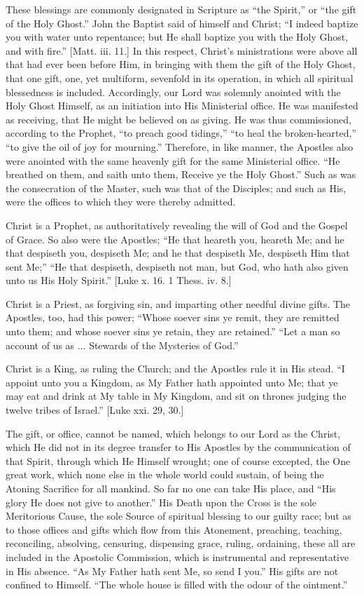 These blessings are commonly designated in Scripture as ``the
Spirit,'' or ``the gift of the Holy Ghost.'' John the
Baptist said of himself and Christ; ``I indeed baptize you with
water unto repentance; but He shall baptize you with the Holy Ghost, and
with fire.'' [Matt. iii. 11.] In this respect, Christ's
ministrations were above all that had ever been before Him, in bringing
with them the gift of the Holy Ghost, that one gift, one, yet multiform,
sevenfold in its operation, in which all spiritual blessedness is
included. Accordingly, our Lord was solemnly anointed with the Holy
Ghost Himself, as an initiation into His Ministerial office. He was
manifested as receiving, that He might be believed on as giving. He was
thus commissioned, according to the Prophet, ``to preach good
tidings,'' ``to heal the broken-hearted,'' ``to give the
oil of joy for mourning.'' Therefore, in like manner, the Apostles
also were anointed with the same heavenly gift for the same Ministerial
office. ``He breathed on them, and saith unto them, Receive ye the
Holy Ghost.'' Such as was the consecration of the Master, such was
that of the Disciples; and such as His, were the offices to which they
were thereby admitted.

Christ is a Prophet, as authoritatively revealing the will of God and
the Gospel of Grace. So also were the Apostles; ``He that heareth
you, heareth Me; and he that despiseth you, despiseth Me; and he that
despiseth Me, despiseth Him that sent Me;'' ``He that despiseth,
despiseth not man, but God, who hath also given unto us His Holy
Spirit.'' [Luke x. 16. 1 Thess. iv. 8.]

Christ is a Priest, as forgiving sin, and imparting other needful
divine gifts. The Apostles, too, had this power; ``Whose soever sins
ye remit, they are remitted unto them; and whose soever sins ye retain,
they are retained.'' ``Let a man so account of us as ...
Stewards of the Mysteries of God.''

Christ is a King, as ruling the Church; and the Apostles rule it in
His stead. ``I appoint unto you a Kingdom, as My Father hath
appointed unto Me; that ye may eat and drink at My table in My Kingdom,
and sit on thrones judging the twelve tribes of Israel.'' [Luke xxi.
29, 30.]

The gift, or office, cannot be named, which belongs to our Lord as
the Christ, which He did not in its degree transfer to His Apostles by
the communication of that Spirit, through which He Himself wrought; one
of course excepted, the One great work, which none else in the whole
world could sustain, of being the Atoning Sacrifice for all mankind. So
far no one can take His place, and ``His glory He does not give to
another.'' His Death upon the Cross is the sole Meritorious Cause,
the sole Source of spiritual blessing to our guilty race; but as to
those offices and gifts which flow from this Atonement, preaching,
teaching, reconciling, absolving, censuring, dispensing grace, ruling,
ordaining, these all are included in the Apostolic Commission, which is
instrumental and representative in His absence. ``As My Father hath
sent Me, so send I you.'' His gifts are not confined to Himself.
``The whole house is filled with the odour of the ointment.''

